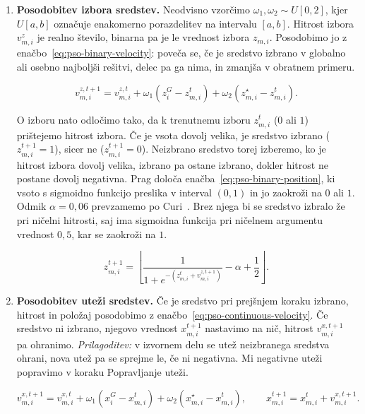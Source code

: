 \documentclass[9pt]{style/friteza}
\begin{document}
\begin{enumerate}
    \item \textbf{Posodobitev izbora sredstev.}
    Neodvisno vzorčimo $\omega_1,\omega_2\sim U[0,2]$, kjer $U[a,b]$ označuje enakomerno porazdelitev na intervalu $[a,b]$. Hitrost izbora $v^{z}_{m,i}$ je realno število, binarna pa je le vrednost izbora $z_{m,i}$. Posodobimo jo z enačbo~\eqref{eq:pso-binary-velocity}: poveča se, če je sredstvo izbrano v globalno ali osebno najboljši rešitvi, delec pa ga nima, in zmanjša v obratnem primeru. 
    
    \begin{equation}
    \label{eq:pso-binary-velocity}
    v^{z,t+1}_{m,i}
    =
    v^{z,t}_{m,i}
    +
    \omega_1\left(z_i^{G}-z^{t}_{m,i}\right)
    +
    \omega_2\left(z^{\star}_{m,i}-z^{t}_{m,i}\right).
    \end{equation}

    O izboru nato odločimo tako, da k trenutnemu izboru $z^t_{m,i}$ ($0$ ali $1$) prištejemo hitrost izbora. Če je vsota dovolj velika, je sredstvo izbrano ($z^{t+1}_{m,i}=1$), sicer ne ($z^{t+1}_{m,i}=0$). Neizbrano sredstvo torej izberemo, ko je hitrost izbora dovolj velika, izbrano pa ostane izbrano, dokler hitrost ne postane dovolj negativna. Prag določa enačba~\eqref{eq:pso-binary-position}, ki vsoto s sigmoidno funkcijo preslika v interval $(0,1)$ in jo zaokroži na $0$ ali $1$. Odmik $\alpha=0{,}06$ prevzamemo po Curi~\cite{cura2009}. Brez njega bi se sredstvo izbralo že pri ničelni hitrosti, saj ima sigmoidna funkcija pri ničelnem argumentu vrednost $0{,}5$, kar se zaokroži na $1$.

    \begin{equation}
    \label{eq:pso-binary-position}
    z^{t+1}_{m,i}
    =
    \left\lfloor
    \frac{1}{1+e^{-\left(z^{t}_{m,i}+v^{z,t+1}_{m,i}\right)}}-\alpha+\frac{1}{2}
    \right\rfloor.
    \end{equation}

    \item \textbf{Posodobitev uteži sredstev.}
    Če je sredstvo pri prejšnjem koraku izbrano, hitrost in položaj posodobimo z enačbo~\eqref{eq:pso-continuous-velocity}. Če sredstvo ni izbrano, njegovo vrednost $x^{t+1}_{m,i}$ nastavimo na nič, hitrost $v^{x,t+1}_{m,i}$ pa ohranimo. \emph{Prilagoditev:} v izvornem delu se utež neizbranega sredstva ohrani, nova utež pa se sprejme le, če ni negativna. Mi negativne uteži popravimo v koraku Popravljanje uteži.
    
    \begin{equation}
    \label{eq:pso-continuous-velocity}
    v^{x,t+1}_{m,i}
    =
    v^{x,t}_{m,i}
    +
    \omega_1\left(x_i^{G}-x^{t}_{m,i}\right)
    +
    \omega_2\left(x^{\star}_{m,i}-x^{t}_{m,i}\right),
    \qquad
    x^{t+1}_{m,i}
    =
    x^{t}_{m,i}
    +
    v^{x,t+1}_{m,i}.
    \end{equation}


\end{enumerate}
\end{document}
